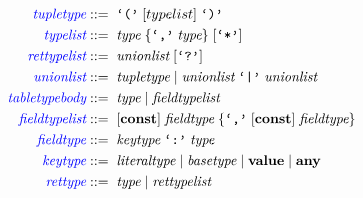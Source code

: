 \begin{align*}
\textcolor{blue}{\textit{tupletype}} & ::= \; \texttt{`('} \; [typelist] \; \texttt{`)'}\\
\textcolor{blue}{\textit{typelist}} & ::= \; \textit{type} \; \{\texttt{`,'} \; \textit{type}\} \; [\texttt{`*'}]\\
\textcolor{blue}{\textit{rettypelist}} & ::= \; \textit{unionlist} \; [\texttt{`?'}]\\
\textcolor{blue}{\textit{unionlist}} & ::= \; \textit{tupletype} \; | \;
  \textit{unionlist} \; \texttt{`|'} \; \textit{unionlist}\\
\textcolor{blue}{\textit{tabletypebody}} & ::= \; \textit{type} \; | \; \textit{fieldtypelist}\\
\textcolor{blue}{\textit{fieldtypelist}} & ::= \; [\textbf{const}] \; \textit{fieldtype} \; \{\texttt{`,'} \; [\textbf{const}] \; \textit{fieldtype}\}\\ 
\textcolor{blue}{\textit{fieldtype}} & ::= \; \textit{keytype} \; \texttt{`:'} \; \textit{type}\\
\textcolor{blue}{\textit{keytype}} & ::= \; \textit{literaltype} \; | \;
  \textit{basetype} \; | \;
  \textbf{value} \; | \;
  \textbf{any}\\
\textcolor{blue}{\textit{rettype}} & ::= \; \textit{type} \; | \; \textit{rettypelist}\\
\end{align*}
